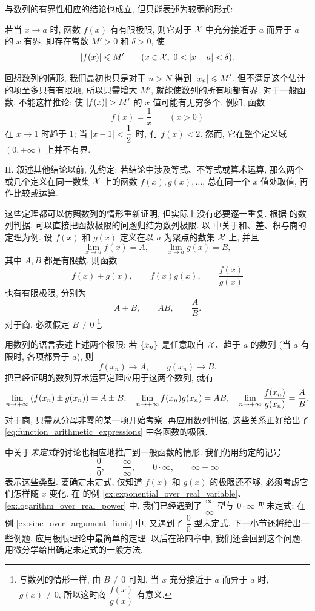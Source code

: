 与数列的有界性相应的结论也成立, 但只能表述为较弱的形式:

\myrefparagraph{4\textdegree}\label{prop:function_bounded_near_limit_point}
{\kaishu 若当 $x\to a$ 时, 函数 $f(x)$ 有有限极限,
则它对于 $\mathcal{X}$ 中充分接近于 $a$ 而异于 $a$ 的 $x$ 有界, 即存在常数 $M'>0$ 和 $\delta>0$, 使
$$
\abs{f(x)}\leq M'\qquad (x\in\X,\ 0<\abs{x-a}<\delta).
$$}

回想数列的情形, 我们最初也只是对于 $n>N$ 得到 $\left| x_n \right|\leqslant M'$.
但不满足这个估计的项至多只有有限项, 所以只需增大 $M'$, 就能使数列的所有项都有界.
对于一般函数, 不能这样推论: 使 $\abs{f(x)}>M'$ 的 $x$ 值可能有无穷多个.
例如, 函数
$$
f(x)=\frac1x\qquad (x>0)
$$
在 $x\to1$ 时趋于 $1$; 当 $\left| x-1 \right|<\dfrac12$ 时, 有 $f(x)<2$.
然而, 它在整个定义域 $(0,+\infty)$ 上并不有界.

II. 叙述其他结论以前, 先约定: 若结论中涉及等式、不等式或算术运算,
那么两个或几个定义在同一数集 $\mathcal{X}$ 上的函数 $f(x),g(x),\ldots$,
总在同一个 $x$ 值处取值, 再作比较或运算.

这些定理都可以仿照数列的情形重新证明, 但实际上没有必要逐一重复.
根据  的数列判据, 可以直接把函数极限的问题归结为数列极限.
以  中关于和、差、积与商的定理为例.
设 $f(x)$ 和 $g(x)$ 定义在以 $a$ 为聚点的数集 $\mathcal{X}$ 上, 并且
$$
\lim_{x\to a}f(x)=A,\qquad \lim_{x\to a}g(x)=B,
$$
其中 $A,B$ 都是有限数. 则函数
\begin{equation}\label{eq:function_arithmetic_expressions}
f(x)\pm g(x),\qquad f(x)g(x),\qquad \frac{f(x)}{g(x)}
\end{equation}
也有有限极限, 分别为
$$
A\pm B,\qquad AB,\qquad \frac AB.
$$
对于商, 必须假定 $B\neq0$
\footnote{与数列的情形一样, 由 $B\neq0$ 可知, 当 $x$ 充分接近于 $a$ 而异于 $a$ 时,
$g(x)\neq0$, 所以这时商 $\dfrac{f(x)}{g(x)}$ 有意义.}.

用数列的语言表述上述两个极限: 若 $\{x_{n}\}$ 是任意取自 $\mathcal{X}$、趋于 $a$ 的数列
(当 $a$ 有限时, 各项都异于 $a$), 则
$$
f(x_n)\to A,\qquad g(x_n)\to B.
$$
把已经证明的数列算术运算定理应用于这两个数列, 就有
$$
\lim_{n\to+\infty}\left( f(x_n)\pm g(x_n) \right)=A\pm B,\quad
\lim_{n\to+\infty}f(x_n)g(x_n)=AB,\quad
\lim_{n\to+\infty}\frac{f(x_n)}{g(x_n)}=\frac AB.
$$
对于商, 只需从分母非零的某一项开始考察.
再应用数列判据, 这些关系正好给出了 \eqref{eq:function_arithmetic_expressions} 中各函数的极限.

 中关于\emph{未定式}的讨论也相应地推广到一般函数的情形.
我们仍用约定的记号
$$
\frac00,\qquad \frac\infty\infty,\qquad 0\cdot\infty,\qquad \infty-\infty
$$
表示这些类型. 要确定未定式, 仅知道 $f(x)$ 和 $g(x)$ 的极限还不够,
必须考虑它们怎样随 $x$ 变化.
在  的例 \ref{ex:exponential_over_real_variable}、\ref{ex:logarithm_over_real_power} 中,
我们已经遇到了 $\dfrac\infty\infty$ 型与 $0\cdot\infty$ 型未定式;
在例 \ref{ex:sine_over_argument_limit} 中, 又遇到了 $\dfrac00$ 型未定式.
下一小节还将给出一些例题, 应用极限理论中最简单的定理.
以后在第四章中, 我们还会回到这个问题, 用微分学给出确定未定式的一般方法.

